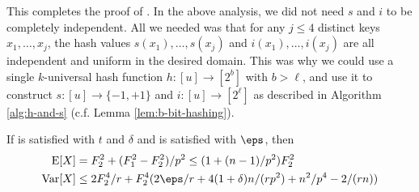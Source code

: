 This completes the proof of . In the above analysis, we
did not need $s$ and $i$ to be completely independent. All we needed
was that for any $j\leq 4$ distinct keys $x_1,\ldots,x_j$, the hash
values $s(x_1),\ldots,s(x_j)$ and $i(x_1),\ldots,i(x_j)$ are all
independent and uniform in the desired domain. This was why we could
use a single $k$-universal hash function $h:[u]\to[2^b]$ with
$b>\ell$, and use it to construct $s:[u]\to\{-1,+1\}$ and
$i:[u]\to[2^\ell]$ as described in Algorithm \ref{alg:h-and-s}
(c.f. Lemma \ref{lem:b-bit-hashing}).


\begin{lemma}
    If  is satisfied with $t$
    and $\delta$ and  is satisfied with
    $\eps$, then
    \begin{align}
        \E[X] &= F_2^2 + (F_1^2 - F_2^2)/p^2 \le (1 + (n - 1)/p^2)F_2^2\\
        \Var[X] &\le 2F_2^4/r + F_2^4 (2\eps/r + 4(1 + \delta)n / (rp^2) + n^2/p^4 - 2 /(rn))
    \end{align}
\end{lemma}
